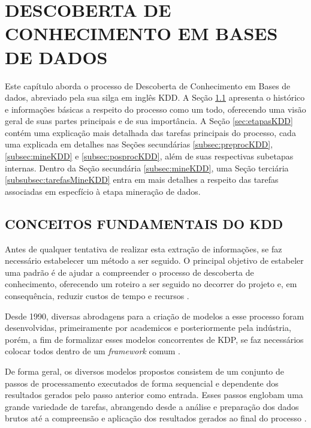 
%

\chapter{DESCOBERTA DE CONHECIMENTO EM BASES DE DADOS}
\label{chap:descobertaConhecimento}
Este capítulo aborda o processo de Descoberta de Conhecimento em Bases de dados, abreviado pela sua silga em inglês KDD. A Seção \ref{sec:conceitosKDD} apresenta o histórico e informações básicas a respeito do processo como um todo, oferecendo uma visão geral de suas partes principais e de sua importância. A Seção \ref{sec:etapasKDD} contém uma explicação mais detalhada das tarefas principais do processo, cada uma explicada em detalhes nas Seções secundárias \ref{subsec:preprocKDD}, \ref{subsec:mineKDD} e \ref{subsec:posprocKDD}, além de suas respectivas subetapas internas. Dentro da Seção secundária \ref{subsec:mineKDD}, uma Seção terciária \ref{subsubsec:tarefasMineKDD} entra em mais detalhes a respeito das tarefas associadas em especfício à etapa mineração de dados.

\section{CONCEITOS FUNDAMENTAIS DO KDD}
\label{sec:conceitosKDD}

Antes de qualquer tentativa de realizar esta extração de informações, se faz necessário estabelecer um método a ser seguido. O principal objetivo de estabeler uma padrão é de ajudar a compreender o processo de descoberta de conhecimento, oferecendo um roteiro a ser seguido no decorrer do projeto e, em consequência, reduzir custos de tempo e recursos .

Desde 1990, diversas abrodagens para a criação de modelos a esse processo foram desenvolvidas, primeiramente por academicos e posteriormente pela indústria, porém, a fim de formalizar esses modelos concorrentes de KDP, se faz necessários colocar todos dentro de um \textit{framework} comum .

De forma geral, os diversos modelos propostos consistem de um conjunto de passos de processamento executados de forma sequencial e dependente dos resultados gerados pelo passo anterior como entrada. Esses passos englobam uma grande variedade de tarefas, abrangendo desde a análise e preparação dos dados brutos até a compreensão e aplicação dos resultados gerados ao final do processo . 


